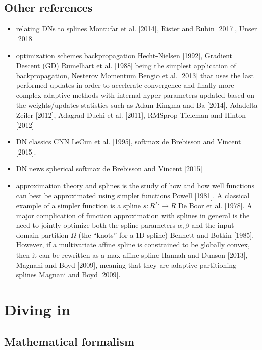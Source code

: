 \documentclass{article}
\begin{document}
\subsection{Other references}

\begin{itemize}
	\item relating DNs to splines
		\subitem Montufar et al. [2014], Rister and Rubin [2017], Unser [2018]
	\item optimization schemes
		\subitem backpropagation Hecht-Nielsen [1992], Gradient Descent (GD) Rumelhart et al. [1988] being the simplest application of backpropagation, Nesterov Momentum Bengio et al. [2013] that uses the last performed updates in order to accelerate convergence and finally more complex adaptive methods with internal hyper-parameters updated based on the weights/updates statistics such as Adam Kingma and Ba [2014], Adadelta Zeiler [2012], Adagrad Duchi et al. [2011], RMSprop Tieleman and Hinton [2012]
	\item DN classics
		\subitem CNN LeCun et al. [1995], softmax de Brebisson and Vincent [2015].
	\item DN news
		\subitem spherical softmax  de Brebisson and Vincent [2015]
	\item approximation theory and splines
		\subitem is the study of how and how well functions can best be approximated using simpler functions Powell [1981]. A classical example of a simpler function is a spline $s : R^D \rightarrow R$ De Boor et al. [1978]. A major complication of function approximation with splines in general is the need to jointly optimize both the spline parameters $\alpha, \beta$ and the input domain partition $\Omega$ (the ``knots'' for a 1D spline) Bennett and Botkin [1985]. However, if a multivariate affine spline is constrained to be globally convex, then it can be rewritten as a max-affine spline Hannah and Dunson [2013], Magnani and Boyd [2009], meaning that they are adaptive partitioning splines Magnani and Boyd [2009].
\end{itemize}


\section{Diving in}


\subsection{Mathematical  formalism}
\end{document}
